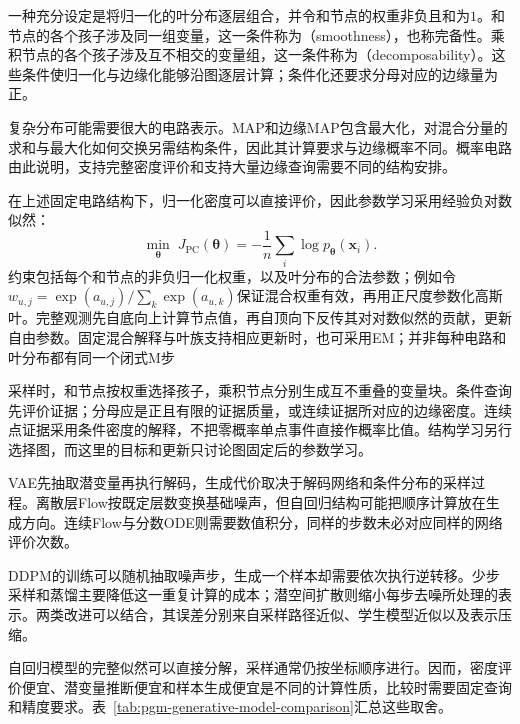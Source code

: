 一种充分设定是将归一化的叶分布逐层组合，并令和节点的权重非负且和为$1$。和节点的各个孩子涉及同一组变量，这一条件称为（smoothness），也称完备性。乘积节点的各个孩子涉及互不相交的变量组，这一条件称为（decomposability）。这些条件使归一化与边缘化能够沿图逐层计算；条件化还要求分母对应的边缘量为正。

复杂分布可能需要很大的电路表示。MAP和边缘MAP包含最大化，对混合分量的求和与最大化如何交换另需结构条件，因此其计算要求与边缘概率不同。概率电路由此说明，支持完整密度评价和支持大量边缘查询需要不同的结构安排。

在上述固定电路结构下，归一化密度可以直接评价，因此参数学习采用经验负对数似然：
\begin{equation}
  \label{eq:pgm-generative-circuit-objective}
  \min_{\bm\theta}\;J_{\mathrm{PC}}(\bm\theta)
     =-\frac1n\sum_i\log p_{\bm\theta}(\bm x_i).
\end{equation}
约束包括每个和节点的非负归一化权重，以及叶分布的合法参数；例如令$w_{u,j}=\exp(a_{u,j})/\sum_k\exp(a_{u,k})$保证混合权重有效，再用正尺度参数化高斯叶。完整观测先自底向上计算节点值，再自顶向下反传其对对数似然的贡献，更新自由参数。固定混合解释与叶族支持相应更新时，也可采用EM；并非每种电路和叶分布都有同一个闭式M步

采样时，和节点按权重选择孩子，乘积节点分别生成互不重叠的变量块。条件查询先评价证据；分母应是正且有限的证据质量，或连续证据所对应的边缘密度。连续点证据采用条件密度的解释，不把零概率单点事件直接作概率比值。结构学习另行选择图，而这里的目标和更新只讨论图固定后的参数学习。

\label{sec:pgm-generative-sampling-cost}

VAE先抽取潜变量再执行解码，生成代价取决于解码网络和条件分布的采样过程。离散层Flow按既定层数变换基础噪声，但自回归结构可能把顺序计算放在生成方向。连续Flow与分数ODE则需要数值积分，同样的步数未必对应同样的网络评价次数。

DDPM的训练可以随机抽取噪声步，生成一个样本却需要依次执行逆转移。少步采样和蒸馏主要降低这一重复计算的成本；潜空间扩散则缩小每步去噪所处理的表示。两类改进可以结合，其误差分别来自采样路径近似、学生模型近似以及表示压缩。

自回归模型的完整似然可以直接分解，采样通常仍按坐标顺序进行。因而，密度评价便宜、潜变量推断便宜和样本生成便宜是不同的计算性质，比较时需要固定查询和精度要求。表~\ref{tab:pgm-generative-model-comparison}汇总这些取舍。

